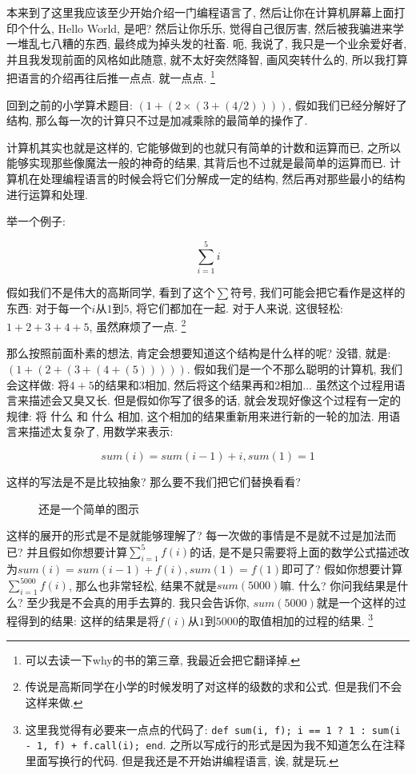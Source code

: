 本来到了这里我应该至少开始介绍一门编程语言了, 然后让你在计算机屏幕上面打印个什么, Hello World, 是吧? 然后让你乐乐, 觉得自己很厉害, 然后被我骗进来学一堆乱七八糟的东西, 最终成为掉头发的社畜. 呃, 我说了, 我只是一个业余爱好者, 并且我发现前面的风格如此随意, 就不太好突然降智, 画风突转什么的, 所以我打算把语言的介绍再往后推一点点. 就一点点. \footnote{可以去读一下why的书的第三章, 我最近会把它翻译掉. }

回到之前的小学算术题目: $(1 + (2 \times (3 + (4 / 2))))$, 假如我们已经分解好了结构, 那么每一次的计算只不过是加减乘除的最简单的操作了. 

计算机其实也就是这样的, 它能够做到的也就只有简单的计数和运算而已, 之所以能够实现那些像魔法一般的神奇的结果, 其背后也不过就是最简单的运算而已. 计算机在处理编程语言的时候会将它们分解成一定的结构, 然后再对那些最小的结构进行运算和处理. 

举一个例子: 

$$\sum_{i = 1}^5 i$$

假如我们不是伟大的高斯同学, 看到了这个$\sum$符号, 我们可能会把它看作是这样的东西: 对于每一个$i$从$1$到$5$, 将它们都加在一起. 对于人来说, 这很轻松: $1 + 2 + 3 + 4 + 5$, 虽然麻烦了一点. \footnote{传说是高斯同学在小学的时候发明了对这样的级数的求和公式. 但是我们不会这样来做. }

那么按照前面朴素的想法, 肯定会想要知道这个结构是什么样的呢? 没错, 就是: $(1 + (2 + (3 + (4 + (5)))))$. 假如我们是一个不那么聪明的计算机, 我们会这样做: 将$4 + 5$的结果和$3$相加, 然后将这个结果再和$2$相加... 虽然这个过程用语言来描述会又臭又长. 但是假如你写了很多的话, 就会发现好像这个过程有一定的规律: 将 什么 和 什么 相加, 这个相加的结果重新用来进行新的一轮的加法. 用语言来描述太复杂了, 用数学来表示: 

$$ sum(i) = sum(i - 1) + i , sum(1) = 1$$

这样的写法是不是比较抽象? 那么要不我们把它们替换看看? 

\begin{figure}[h]
  \centering
  \caption{还是一个简单的图示}
\end{figure}

这样的展开的形式是不是就能够理解了? 每一次做的事情是不是就不过是加法而已? 并且假如你想要计算$\sum_{i = 1}^5 f(i)$的话, 是不是只需要将上面的数学公式描述改为$ sum(i) = sum(i - 1) + f(i) , sum(1) = f(1)$即可了? 假如你想要计算$\sum_{i = 1}^5000 f(i)$, 那么也非常轻松, 结果不就是$sum(5000)$嘛. 什么? 你问我结果是什么? 至少我是不会真的用手去算的. 我只会告诉你, $sum(5000)$就是一个这样的过程得到的结果: 这样的结果是将$f(i)$从$1$到$5000$的取值相加的过程的结果. \footnote{这里我觉得有必要来一点点的代码了: \texttt{def sum(i, f); i == 1 ? 1 : sum(i - 1, f) + f.call(i); end}. 之所以写成行的形式是因为我不知道怎么在注释里面写换行的代码. 但是我还是不开始讲编程语言, 诶, 就是玩. }

